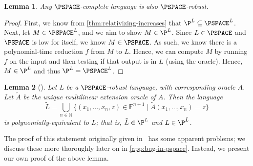 \documentclass[english]{reedthesis}
\theoremstyle{plain}
\newtheorem{lemma}[lemma]{Lemma}
\theoremstyle{definition}
\theoremstyle{remark}
\begin{document}
\begin{lemma}\label{lem:complete-is-robust}
  Any $\PSPACE$-complete language is also $\PSPACE$-robust.
\end{lemma}

\begin{proof}
  First, we know from \cref{thm:relativizing-increases} that
  $\P^{L} \subseteq \PSPACE^{L}$. Next, let $M \in \PSPACE^{L}$, and we aim to show
  $M \in \P^{L}$. Since $L \in \PSPACE$ and $\PSPACE$ is low for itself, we know
  $M \in \PSPACE$. As such, we know there is a polynomial-time reduction $f$ from
  $M$ to $L$. Hence, we can compute $M$ by running $f$ on the input and then
  testing if that output is in $L$ (using the oracle). Hence, $M \in \P^{L}$ and
  thus $\P^{L} = \PSPACE^{L}$.
\end{proof}

\begin{lemma}[{\cite[Lemma 6.2]{BFL90}}]\label{lem:multilinear-is-pspace}
  Let $L$ be a $\PSPACE$-robust language, with corresponding oracle $A$. Let
  $\tilde{A}$ be the unique multilinear extension oracle of $A$. Then the
  language
  \begin{equation}
    \tilde{L} = \bigcup_{n \in \mathbb{N}}\{(x_{1}, \ldots, x_{n}, z) \in \mathbb{F}^{n+1} \mid \tilde{A}(x_{1}, \ldots, x_{n}) = z\}
  \end{equation}
  is polynomially-equivalent to $L$; that is, $\tilde{L} \in \P^{L}$ and
  $L \in \P^{\tilde{L}}$.
\end{lemma}

The proof of this statement originally given in~\cite{BFL90} has some apparent
problems; we discuss these more thoroughly later on in \cref{app:bug-in-pspace}.
Instead, we present our own proof of the above lemma.
\end{document}
